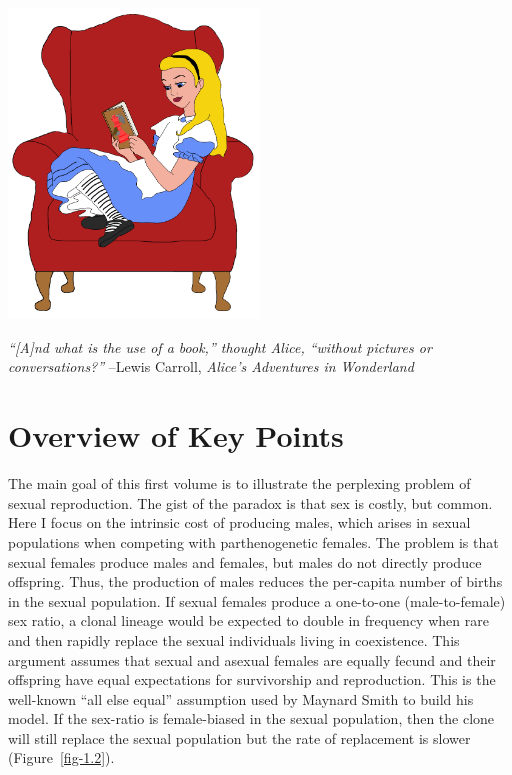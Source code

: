 \documentclass[
  letterpaper,
]{book}
\begin{document}
\begin{center}
\includegraphics[width=0.5\textwidth,height=\textheight]{images/fig7-1.png}
\end{center}

\emph{``{[}A{]}nd what is the use of a book,'' thought Alice, ``without
pictures or conversations?''} --Lewis Carroll, \emph{Alice's Adventures
in Wonderland}

\section{Overview of Key Points}\label{overview-of-key-points}

The main goal of this first volume is to illustrate the perplexing
problem of sexual reproduction. The gist of the paradox is that sex is
costly, but common. Here I focus on the intrinsic cost of producing
males, which arises in sexual populations when competing with
parthenogenetic females. The problem is that sexual females produce
males and females, but males do not directly produce offspring. Thus,
the production of males reduces the per-capita number of births in the
sexual population. If sexual females produce a one-to-one
(male-to-female) sex ratio, a clonal lineage would be expected to double
in frequency when rare and then rapidly replace the sexual individuals
living in coexistence. This argument assumes that sexual and asexual
females are equally fecund and their offspring have equal expectations
for survivorship and reproduction. This is the well-known ``all else
equal'' assumption used by Maynard Smith to build his model. If the
sex-ratio is female-biased in the sexual population, then the clone will
still replace the sexual population but the rate of replacement is
slower (Figure~\ref{fig-1.2}).
\end{document}
